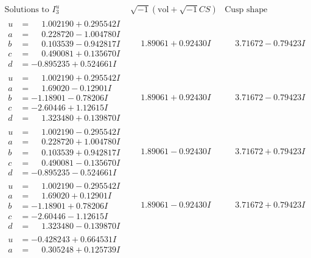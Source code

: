 \documentclass[1p]{elsarticle_modified}
\theoremstyle{definition}
\newcommand{\I}{\sqrt{-1}}
\begin{document}
$$\begin{array}{c|c|c}  
\text{Solutions to }I^u_{3}& \I (\text{vol} + \sqrt{-1}CS) & \text{Cusp shape}\\
 \hline 
\begin{aligned}
u &= \phantom{-}1.002190 + 0.295542 I \\
a &= \phantom{-}0.228720 - 1.004780 I \\
b &= \phantom{-}0.103539 - 0.942817 I \\
c &= \phantom{-}0.490081 + 0.135670 I \\
d &= -0.895235 + 0.524661 I\end{aligned}
 & \phantom{-}1.89061 + 0.92430 I & \phantom{-}3.71672 - 0.79423 I \\ \hline\begin{aligned}
u &= \phantom{-}1.002190 + 0.295542 I \\
a &= \phantom{-}1.69020 - 0.12901 I \\
b &= -1.18901 - 0.78206 I \\
c &= -2.60446 + 1.12615 I \\
d &= \phantom{-}1.323480 + 0.139870 I\end{aligned}
 & \phantom{-}1.89061 + 0.92430 I & \phantom{-}3.71672 - 0.79423 I \\ \hline\begin{aligned}
u &= \phantom{-}1.002190 - 0.295542 I \\
a &= \phantom{-}0.228720 + 1.004780 I \\
b &= \phantom{-}0.103539 + 0.942817 I \\
c &= \phantom{-}0.490081 - 0.135670 I \\
d &= -0.895235 - 0.524661 I\end{aligned}
 & \phantom{-}1.89061 - 0.92430 I & \phantom{-}3.71672 + 0.79423 I \\ \hline\begin{aligned}
u &= \phantom{-}1.002190 - 0.295542 I \\
a &= \phantom{-}1.69020 + 0.12901 I \\
b &= -1.18901 + 0.78206 I \\
c &= -2.60446 - 1.12615 I \\
d &= \phantom{-}1.323480 - 0.139870 I\end{aligned}
 & \phantom{-}1.89061 - 0.92430 I & \phantom{-}3.71672 + 0.79423 I \\ \hline\begin{aligned}
u &= -0.428243 + 0.664531 I \\
a &= \phantom{-}0.305248 + 0.125739 I \\

\end{aligned}
\end{array}$$
\end{document}
